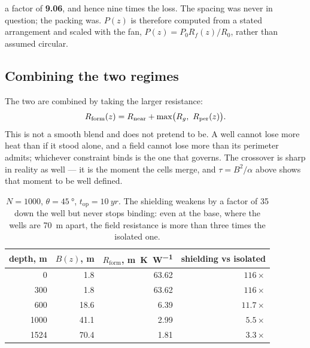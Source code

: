 \noindent a factor of \textbf{9.06}, and hence nine times the loss. The
spacing was never in question; the packing was. $P(z)$ is therefore computed
from a stated arrangement and scaled with the fan, $P(z) = P_0 R_f(z)/R_0$,
rather than assumed circular.

\subsection{Combining the two regimes}

The two are combined by taking the larger resistance:
\begin{equation}
R_{\mathrm{form}}(z) = \Rnear + \max\!\big(\Rg,\ \Rper(z)\big).
\label{eq:maxrule}
\end{equation}
This is not a smooth blend and does not pretend to be. A well cannot lose more
heat than if it stood alone, and a field cannot lose more than its perimeter
admits; whichever constraint binds is the one that governs. The crossover is
sharp in reality as well --- it is the moment the cells merge, and $\tau =
B^2/\alpha$ above shows that moment to be well defined.

\begin{table}[h]
\centering
\begin{tabular}{rrrr}
\toprule
depth, \si{\metre} & $B(z)$, \si{\metre} & $R_{\mathrm{form}}$, \si{\metre\kelvin\per\watt}
 & shielding vs isolated \\
\midrule
0    & 1.8  & 63.62 & $116\times$ \\
300  & 1.8  & 63.62 & $116\times$ \\
600  & 18.6 & 6.39  & $11.7\times$ \\
1000 & 41.1 & 2.99  & $5.5\times$ \\
1524 & 70.4 & 1.81  & $3.3\times$ \\
\bottomrule
\end{tabular}
\caption{$N = 1000$, $\theta = \SI{45}{\degree}$, $t_{\mathrm{op}} =
\SI{10}{yr}$. The shielding weakens by a factor of 35 down the well but never
stops binding: even at the base, where the wells are \SI{70}{\metre} apart,
the field resistance is more than three times the isolated one.}
\end{table}

